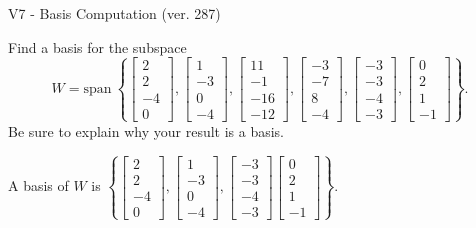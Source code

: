 \begin{exercise}
  \begin{exerciseTitle}V7 - Basis Computation (ver. 287)\end{exerciseTitle}
  \begin{exerciseStatement}
    Find a basis for the subspace 
\[W=\mathrm{span}\ \left\{\left[\begin{array}{r}
2 \\
2 \\
-4 \\
0
\end{array}\right] , \left[\begin{array}{r}
1 \\
-3 \\
0 \\
-4
\end{array}\right] , \left[\begin{array}{r}
11 \\
-1 \\
-16 \\
-12
\end{array}\right] , \left[\begin{array}{r}
-3 \\
-7 \\
8 \\
-4
\end{array}\right] , \left[\begin{array}{r}
-3 \\
-3 \\
-4 \\
-3
\end{array}\right] , \left[\begin{array}{r}
0 \\
2 \\
1 \\
-1
\end{array}\right]\right\}.\]
 Be sure to explain why your result is a basis.


  \end{exerciseStatement}
  \begin{exerciseAnswer}
   A basis of \(W\) is  \(\left\{\left[\begin{array}{r}
2 \\
2 \\
-4 \\
0
\end{array}\right] , \left[\begin{array}{r}
1 \\
-3 \\
0 \\
-4
\end{array}\right] , \left[\begin{array}{r}
-3 \\
-3 \\
-4 \\
-3
\end{array}\right] \left[\begin{array}{r}
0 \\
2 \\
1 \\
-1
\end{array}\right]\right\}\).
  


  \end{exerciseAnswer}
\end{exercise}